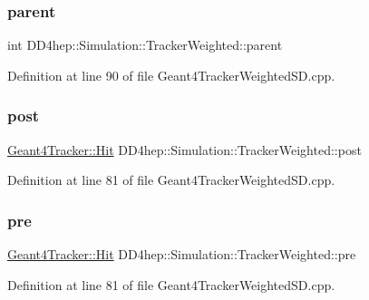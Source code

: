\subsubsection{\texorpdfstring{parent}{parent}}
{\footnotesize\ttfamily int D\+D4hep\+::\+Simulation\+::\+Tracker\+Weighted\+::parent}



Definition at line 90 of file Geant4\+Tracker\+Weighted\+S\+D.\+cpp.

\hypertarget{struct_d_d4hep_1_1_simulation_1_1_tracker_weighted_af821b8459359ddcb2713bf34f1d72949}{}\label{struct_d_d4hep_1_1_simulation_1_1_tracker_weighted_af821b8459359ddcb2713bf34f1d72949} 
\subsubsection{\texorpdfstring{post}{post}}
{\footnotesize\ttfamily \hyperlink{class_d_d4hep_1_1_simulation_1_1_geant4_tracker_1_1_hit}{Geant4\+Tracker\+::\+Hit} D\+D4hep\+::\+Simulation\+::\+Tracker\+Weighted\+::post}



Definition at line 81 of file Geant4\+Tracker\+Weighted\+S\+D.\+cpp.

\hypertarget{struct_d_d4hep_1_1_simulation_1_1_tracker_weighted_a3bb8dbd97551f655071ce36e357593ef}{}\label{struct_d_d4hep_1_1_simulation_1_1_tracker_weighted_a3bb8dbd97551f655071ce36e357593ef} 
\subsubsection{\texorpdfstring{pre}{pre}}
{\footnotesize\ttfamily \hyperlink{class_d_d4hep_1_1_simulation_1_1_geant4_tracker_1_1_hit}{Geant4\+Tracker\+::\+Hit} D\+D4hep\+::\+Simulation\+::\+Tracker\+Weighted\+::pre}



Definition at line 81 of file Geant4\+Tracker\+Weighted\+S\+D.\+cpp.

\hypertarget{struct_d_d4hep_1_1_simulation_1_1_tracker_weighted_a6c247f2290b5f072a9be93c75dacf631}{}\label{struct_d_d4hep_1_1_simulation_1_1_tracker_weighted_a6c247f2290b5f072a9be93c75dacf631} 
